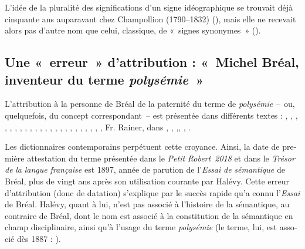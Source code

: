 \documentclass[output=paper]{langsci/langscibook}
\begin{document}
\begin{otherlanguage}{french}
L’idée de la pluralité des significations d’un signe idéographique se trouvait déjà cinquante ans auparavant chez Champollion (1790--1832) (\citealt[311--312]{champollion_precis_1828}), mais elle ne recevait alors pas d’autre nom que celui, classique, de «~signes synonymes~» (\citealt[314]{champollion_precis_1828}).

\subsection{Une «~erreur~» d’attribution : «~Michel Bréal, inventeur du terme \textit{polysémie~}»}

L’attribution à la personne de Bréal de la paternité du terme de \textit{polysémie}  –~ou, quelquefois, du concept correspondant~– est présentée dans différents textes : \citet[15]{firth_technique_1957}, \citet[199]{ullmann_precis_1952}, \citet[147]{ricoeur_metaphore_1975}, \citet[286]{delesalle_linguistique_1986}, \textcites[89]{delesalle_statut_1986}[300--305]{delesalle_vie_1987}, \textcites[22]{nerlich_avant-propos_1993}[1625]{nerlich_study_2001}, \citet[169--170]{peeters_verbe_1993}, \citet{peeters_compte_1994}, \citet[27]{desmet_grammaire_1995}, \citet[118]{branca-rosoff_polysemie_1996}, \citet[11]{victorri_polysemie._1996}, \citet[16]{surcin_expression_1999}, \citet[215]{auroux_semantique_2000}, \citet[156]{siblot_emission_2000}, \citet[4]{nerlich_polysemy:_2003}, \citet[131]{girardin_polysemie_2004}, \citet[51]{piron_analyse_2006}, \citet[55]{cusimano_essai_2008}, \citet[22]{larrivee_histoire_2008}, \citet[116]{thibault_traitement_2009}, \citet[10]{mazaleyrat_vers_2010}, \citet[23]{pauly_polysemie._2010}, \citet[n. p.]{jakimovska_terminologie_2012}, Fr. Rainer, dans \citet{lieber_oxford_2014}, \citet[59]{derradji_forme_2014}, \citet[6]{sorba_presentation_2014},\citet[23]{bisconti_sens_2016}, \citet[4]{bruns_polysemie_2016}, \citet[103]{de_palo_invention_2016}.

Les dictionnaires contemporains perpétuent cette croyance. Ainsi, la date de première attestation du terme présentée dans le \textit{Petit} \textit{Robert~2018} et dans le \textit{Trésor} \textit{de} \textit{la} \textit{langue} \textit{française} est 1897, année de parution de l’\textit{Essai} \textit{de} \textit{sémantique} de Bréal, plus de vingt ans après son utilisation courante par Halévy. Cette erreur d’attribution (donc de datation) s’explique par le succès rapide qu’a connu l’\textit{Essai} de Bréal. Halévy, quant à lui, n’est pas associé à l’histoire de la sémantique, au contraire de Bréal, dont le nom est associé à la constitution de la sémantique en champ disciplinaire, ainsi qu’à l’usage du terme \textit{polysémie} (le terme, lui, est associé dès 1887 : \citealt{baale_bulletin_1887}).


\end{otherlanguage}
\end{document}
